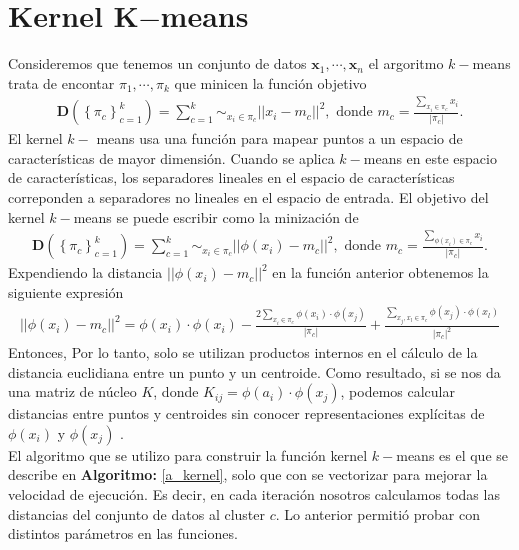 \documentclass[paper=letter, fontsize=11pt]{scrartcl}
\newcommand{\xb}{\mathbf{x}}
\numberwithin{equation}{section} %
\numberwithin{figure}{section} %
\numberwithin{table}{section} %
\begin{document}
\section{Kernel K$-$means}
Consideremos que tenemos un conjunto de datos $\xb_1, \cdots, \xb_n$ el argoritmo $k-$means trata de encontar $\pi_1, \cdots, \pi_k$ que minicen la función objetivo
\begin{align*}
    \mathbf{D}\left( \left\{ \pi_c\right\}_{c=1}^k\right) = \sum_{c=1}^k \sim_{x_i\in \pi_c} ||x_i-m_c||^2, \text{    donde } m_c=\frac{\sum_{x_i\in\pi_c} x_i}{|\pi_c|}. 
\end{align*}
El kernel $k-$ means usa una función para mapear puntos a un espacio de características de mayor dimensión. Cuando se aplica $k-$means en este espacio de características, los separadores lineales en el espacio de características correponden a separadores no lineales en el espacio de entrada. El objetivo del kernel $k-$means se puede escribir como la minización de
\begin{align*}
    \mathbf{D}\left( \left\{ \pi_c\right\}_{c=1}^k\right) = \sum_{c=1}^k \sim_{x_i\in \pi_c} ||\phi(x_i)-m_c||^2, \text{    donde } m_c=\frac{\sum_{\phi(x_i)\in\pi_c} x_i}{|\pi_c|}. 
\end{align*}
Expendiendo la distancia $||\phi(x_i)-m_c||^2$ en la función anterior obtenemos la siguiente expresión
\begin{align*}
    ||\phi(x_i)-m_c||^2 = \phi(x_i)\cdot \phi(x_i)-\frac{2\sum_{x_i\in \pi_c}\phi(x_i)\cdot \phi(x_j)}{|\pi_c|}+\frac{\sum_{x_j,x_l\in \pi_c} \phi(x_j)\cdot\phi(x_l)}{|\pi_c|^2}
\end{align*}
Entonces, Por lo tanto, solo se utilizan productos internos en el cálculo de la distancia euclidiana entre un punto y un centroide. Como resultado, si se nos da una matriz de núcleo $K$, donde $K_{ij} = \phi(a_i) \cdot \phi(x_j)$, podemos calcular distancias entre puntos y centroides sin conocer representaciones explícitas de $\phi(x_i)$ y $\phi(x_j)$ \cite{kernel_kmeans}.\\

El algoritmo que se utilizo para construir la función kernel $k-$means es el que se describe en \textbf{Algoritmo:} \ref{a_kernel}, solo que con se vectorizar para mejorar la velocidad de ejecución. Es decir, en cada iteración nosotros calculamos todas las distancias del conjunto de datos al cluster $c$. Lo anterior permitió probar con distintos parámetros en las funciones.
\end{document}
